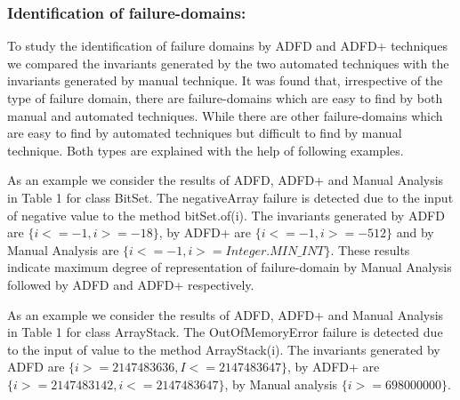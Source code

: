\documentclass[runningheads,a4paper]{llncs}
\begin{document}
\subsubsection{Identification of failure-domains:}
To study the identification of failure domains by ADFD and ADFD+ techniques we compared the invariants generated by the two automated techniques with the invariants generated by manual technique. It was found that, irrespective of the type of failure domain, there are failure-domains which are easy to find by both manual and automated techniques. While there are other failure-domains which are easy to find by automated techniques but difficult to find by manual technique. Both types are explained with the help of following examples.

As an example we consider the results of ADFD, ADFD+ and Manual Analysis in Table 1 for class BitSet. The negativeArray failure is detected due to the input of negative value to the method bitSet.of(i). The invariants generated by ADFD are $\{i <= -1, i >= -18\}$, by ADFD+ are $\{i <= -1, i >= -512\}$ and by Manual Analysis are $\{i <= -1, i >= Integer.MIN\_INT\}$. These results indicate maximum degree of representation of failure-domain by Manual Analysis followed by ADFD and ADFD+ respectively.


As an example we consider the results of ADFD, ADFD+ and Manual Analysis in Table 1 for class ArrayStack. The OutOfMemoryError failure is detected due to the input of value to the method ArrayStack(i). The invariants generated by ADFD are $\{ i >= 2147483636, I <= 2147483647\}$, by ADFD+ are $\{ i >= 2147483142, i <= 2147483647\}$, by Manual analysis $\{ i >= 698000000 \}$.



\end{document}

